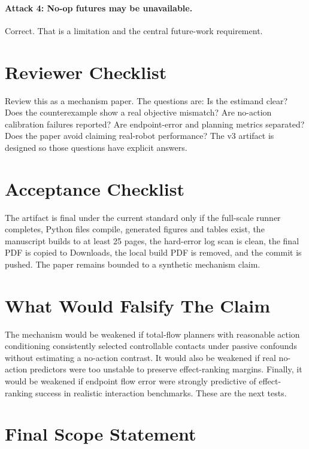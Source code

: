 \documentclass{article}
\begin{document}
\paragraph{Attack 4: No-op futures may be unavailable.}
Correct.  That is a limitation and the central future-work requirement.

\section{Reviewer Checklist}

Review this as a mechanism paper.  The questions are: Is the estimand clear?  Does the
counterexample show a real objective mismatch?  Are no-action calibration failures
reported?  Are endpoint-error and planning metrics separated?  Does the paper avoid
claiming real-robot performance?  The v3 artifact is designed so those questions have
explicit answers.

\section{Acceptance Checklist}

The artifact is final under the current standard only if the full-scale runner completes,
Python files compile, generated figures and tables exist, the manuscript builds to at
least 25 pages, the hard-error log scan is clean, the final PDF is copied to Downloads,
the local build PDF is removed, and the commit is pushed.  The paper remains bounded to a
synthetic mechanism claim.

\section{What Would Falsify The Claim}

The mechanism would be weakened if total-flow planners with reasonable action conditioning
consistently selected controllable contacts under passive confounds without estimating a
no-action contrast.  It would also be weakened if real no-action predictors were too
unstable to preserve effect-ranking margins.  Finally, it would be weakened if endpoint
flow error were strongly predictive of effect-ranking success in realistic interaction
benchmarks.  These are the next tests.

\section{Final Scope Statement}
\end{document}
